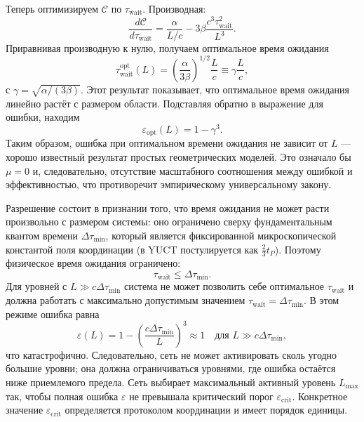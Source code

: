 \documentclass[11pt,a4paper]{article}
\begin{document}
	Теперь оптимизируем \(\mathcal{C}\) по \(\tau_{\mathrm{wait}}\). Производная:
	\[
	\frac{d\mathcal{C}}{d\tau_{\mathrm{wait}}} = \frac{\alpha}{L/c} - 3\beta \frac{c^3\tau_{\mathrm{wait}}^2}{L^3}.
	\]
	Приравнивая производную к нулю, получаем оптимальное время ожидания
	\[
	\tau_{\mathrm{wait}}^{\mathrm{opt}}(L) = \left(\frac{\alpha}{3\beta}\right)^{1/2} \frac{L}{c} \equiv \gamma \frac{L}{c},
	\]
	с \(\gamma = \sqrt{\alpha/(3\beta)}\). Этот результат показывает, что оптимальное время ожидания линейно растёт с размером области. Подставляя обратно в выражение для ошибки, находим
	\[
	\varepsilon_{\mathrm{opt}}(L) = 1 - \gamma^3.
	\]
	Таким образом, ошибка при оптимальном времени ожидания не зависит от \(L\) — хорошо известный результат простых геометрических моделей. Это означало бы \(\mu = 0\) и, следовательно, отсутствие масштабного соотношения между ошибкой и эффективностью, что противоречит эмпирическому универсальному закону.
	
	Разрешение состоит в признании того, что время ожидания не может расти произвольно с размером системы: оно ограничено сверху фундаментальным квантом времени \(\Delta\tau_{\min}\), который является фиксированной микроскопической константой поля координации (в YUCT постулируется как \(\frac23 t_P\)). Поэтому физическое время ожидания ограничено:
	\[
	\tau_{\mathrm{wait}} \le \Delta\tau_{\min}.
	\]
	Для уровней с \(L \gg c\Delta\tau_{\min}\) система не может позволить себе оптимальное \(\tau_{\mathrm{wait}}\) и должна работать с максимально допустимым значением \(\tau_{\mathrm{wait}} = \Delta\tau_{\min}\). В этом режиме ошибка равна
	\[
	\varepsilon(L) = 1 - \left(\frac{c\Delta\tau_{\min}}{L}\right)^3 \approx 1 \quad\text{для } L \gg c\Delta\tau_{\min},
	\]
	что катастрофично. Следовательно, сеть не может активировать сколь угодно большие уровни; она должна ограничиваться уровнями, где ошибка остаётся ниже приемлемого предела. Сеть выбирает максимальный активный уровень \(L_{\max}\) так, чтобы полная ошибка \(\varepsilon\) не превышала критический порог \(\varepsilon_{\mathrm{crit}}\). Конкретное значение \(\varepsilon_{\mathrm{crit}}\) определяется протоколом координации и имеет порядок единицы.
	
\end{document}
